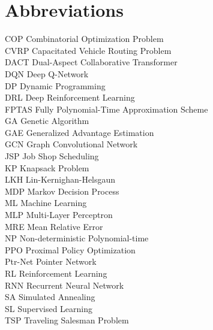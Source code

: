 
\chapter*{Abbreviations}

\begin{flushleft}

COP \hfill Combinatorial Optimization Problem \\
CVRP \hfill Capacitated Vehicle Routing Problem \\
DACT \hfill Dual-Aspect Collaborative Transformer \\
DQN \hfill Deep Q-Network \\
DP \hfill Dynamic Programming \\
DRL \hfill Deep Reinforcement Learning \\
FPTAS \hfill Fully Polynomial-Time Approximation Scheme \\
GA \hfill Genetic Algorithm \\
GAE \hfill Generalized Advantage Estimation \\
GCN \hfill Graph Convolutional Network \\
JSP \hfill Job Shop Scheduling \\
KP \hfill Knapsack Problem \\
LKH \hfill Lin-Kernighan-Helsgaun \\
MDP \hfill Markov Decision Process \\
ML \hfill Machine Learning \\
MLP \hfill Multi-Layer Perceptron \\
MRE \hfill Mean Relative Error \\
NP \hfill Non-deterministic Polynomial-time \\
PPO \hfill Proximal Policy Optimization \\
Ptr-Net \hfill Pointer Network \\
RL \hfill Reinforcement Learning \\
RNN \hfill Recurrent Neural Network \\
SA \hfill Simulated Annealing \\
SL \hfill Supervised Learning \\
TSP \hfill Traveling Salesman Problem \\

\end{flushleft}